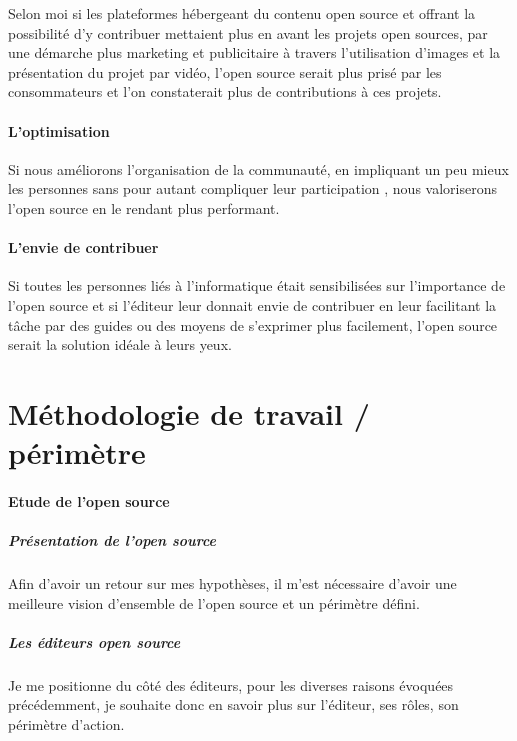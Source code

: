 			Selon moi si les plateformes hébergeant du contenu open source et offrant la possibilité d'y contribuer mettaient plus en avant les projets open sources, par une démarche plus marketing et publicitaire à travers l'utilisation d'images et la présentation du projet par vidéo, l'open source serait plus prisé par les consommateurs et l'on constaterait plus de contributions à ces projets.

		\paragraph{L'optimisation\\}

			Si nous améliorons l'organisation de la communauté, en impliquant un peu mieux les personnes sans pour autant compliquer leur participation , nous valoriserons l'open source en le rendant plus performant.

		\paragraph{L'envie de contribuer\\}

			Si toutes les personnes liés à l'informatique était sensibilisées sur l'importance de l'open source et si l'éditeur leur donnait envie de contribuer en leur facilitant la tâche par des guides ou des moyens de s'exprimer plus facilement, l'open source serait la solution idéale à leurs yeux.

	\section{Méthodologie de travail / périmètre}
		\paragraph{Etude de l'open source}

			\subparagraph{Présentation de l'open source\\}

				Afin d'avoir un retour sur mes hypothèses, il m'est nécessaire d'avoir une meilleure vision d'ensemble de l'open source et un périmètre défini.

			\subparagraph{Les éditeurs open source\\}

				Je me positionne du côté des éditeurs, pour les diverses raisons évoquées précédemment, je souhaite donc en savoir plus sur l'éditeur, ses rôles, son périmètre d'action.

